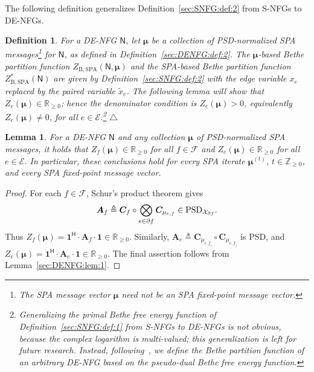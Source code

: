 \documentclass[journal]{IEEEtran}
\newcommand{\add}[1]{{\color{black}#1}}
\newtheorem{lemma}[theorem]{Lemma}
\newtheorem{definition}[theorem]{Definition}
\newcommand{\manualendsymbol}[1]{%
  \leavevmode\unskip\penalty9999\hbox{}\nobreak\hfill
  \quad\hbox{#1}}
\newcommand{\edefinition}{\manualendsymbol{\ensuremath{\triangle}}}
\newcommand{\vect}[1]{ \bm{#1} }
\newcommand{\set}[1]{\mathcal{#1}}
\newcommand{\setEfull}{ \mathcal{E} }
\newcommand{\setF}{ \mathcal{F} }
\newcommand{\setpf}{ \partial f }
\newcommand{\sR}{\mathbb{R}}
\newcommand{\Herm}{\mathsf{H}}
\newcommand{\xe}{ x_{e} }
\newcommand{\vmu}{ \vect{ \mu } }
\newcommand{\graphN}{ \mathsf{N} }
\newcommand{\defeq}{ \triangleq }
\newcommand{\setPSD}[1]{ \mathrm{PSD}_{#1} }
\newcommand{\sRp}{ \mathbb{R}_{\geq 0} }
\newcommand{\sZp}{ \mathbb{Z}_{\geq 0} }
\newcommand{\ZBSPA}{ Z_{\mathrm{B,SPA}} }
\newcommand{\matr}[1]{\vect{#1}}
\newcommand{\ef}{ e,f }
\newcommand{\efi}{ e,f_i }
\newcommand{\efj}{ e,f_j }
\newcommand{\txe}{ \tilde{x}_{e} }
\begin{document}
The following definition generalizes Definition~\ref{sec:SNFG:def:2}
from S-NFGs to DE-NFGs.

\begin{definition}\label{sec:DENFG:def:3}
  \add{For a DE-NFG $\graphN$, let $\vmu$ be a collection of PSD-normalized
    SPA messages}\footnote{The SPA message vector $\vmu$ \add{need not be} an
    SPA fixed-point message vector.}\add{ for $\graphN$, as defined in
    Definition~\ref{sec:DENFG:def:2}. The $\vmu$-based Bethe partition
    function $\ZBSPA(\graphN,\vmu)$ and the SPA-based Bethe partition function
    $\ZBSPA^{*}(\graphN)$ are given by Definition~\ref{sec:SNFG:def:2} with
    the edge variable $\xe$ replaced by the paired variable $\txe$. The
    following lemma will show that $Z_e(\vmu)\in\sR_{\geq0}$; hence the
    denominator condition is $Z_e(\vmu)>0$, equivalently $Z_e(\vmu)\neq0$, for
    all $e\in\setEfull$.}\footnote{\add{Generalizing the primal Bethe free
      energy function of Definition~\ref{sec:SNFG:def:1} from S-NFGs to
      DE-NFGs is not obvious, because the complex logarithm is multi-valued;
      this generalization is left for future research. Instead,
      following~\cite[Definition~8]{Cao2017}, we define the Bethe partition
      function of an arbitrary DE-NFG based on the pseudo-dual Bethe free
      energy function.}}  \edefinition
\end{definition}

\begin{lemma}\label{lem: nonnegative of ZBSPA for DE-NFG}
  \add{For a DE-NFG $\graphN$ and any collection $\vmu$ of PSD-normalized SPA
    messages, it holds that $ Z_f(\vmu) \in \sR_{\geq 0} $ for all
    $f \in \setF$ and $Z_{e}(\vmu) \in \sRp$ for all $e \in \setEfull$.}
  \add{In particular, these conclusions hold for every SPA iterate
    $\vmu^{(t)}$, $t\in\sZp$, and every SPA fixed-point message vector.}
\end{lemma}

\begin{proof}
  \add{For each $f\in\setF$, Schur's product theorem gives}
  \begin{align*}
    \add{\matr{A}_f
      \defeq \matr{C}_f\circ
      \bigotimes_{e\in\setpf}\matr{C}_{\mu_{\ef}}
      \in\setPSD{\set{X}_{\setpf}}.}
  \end{align*}
  \add{Thus
    $Z_f(\vmu)=\bm{1}^{\Herm} \cdot \matr{A}_f  \cdot \bm{1}\in\sR_{\geq0}$.
    Similarly,
    $\matr{A}_e\defeq
      \matr{C}_{\mu_{\efi}}\circ\matr{C}_{\mu_{\efj}}$ is PSD, and
    $Z_e(\vmu)=\bm{1}^{\Herm} \cdot \matr{A}_e \cdot \bm{1}\in\sR_{\geq0}$. The final
    assertion follows from Lemma~\ref{sec:DENFG:lem:1}.}\qedhere

\end{proof}
\end{document}
